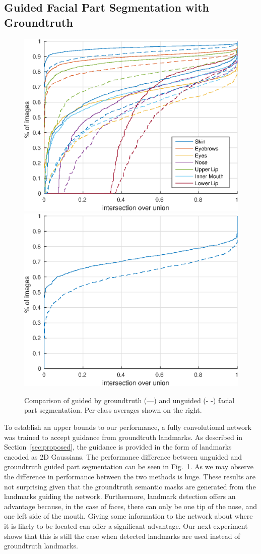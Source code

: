 \subsection{Guided Facial Part Segmentation with Groundtruth}

\begin{figure}
\includegraphics[width=0.5\linewidth]{figs/gtguided-vs-unguided.eps}
\includegraphics[width=0.5\linewidth]{figs/gtguided-vs-unguided-mean.eps}
\caption[Groundtruth Guided vs. Unguided facial part
  segmentation]{Comparison of guided by groundtruth (---) and unguided
  (-{ }-) facial part segmentation. Per-class averages shown on the
  right.  }
\label{fig:gt-vs-un}
\end{figure}

To establish an upper bounds to our performance, a fully convolutional
network was trained to accept guidance from groundtruth landmarks. As
described in Section~\ref{sec:proposed}, the guidance is provided in
the form of landmarks encoded as 2D Gaussians. The performance
difference between unguided and groundtruth guided part segmentation
can be seen in Fig.~\ref{fig:gt-vs-un}. As we may observe the
difference in performance between the two methods is huge. These
results are not surprising given that the groundtruth semantic masks
are generated from the landmarks guiding the network. Furthermore,
landmark detection offers an advantage because, in the case of faces,
there can only be one tip of the nose, and one left side of the
mouth. Giving some information to the network about where it is likely
to be located can offer a significant advantage. Our next experiment
shows that this is still the case when detected landmarks are used
instead of groundtruth landmarks.



